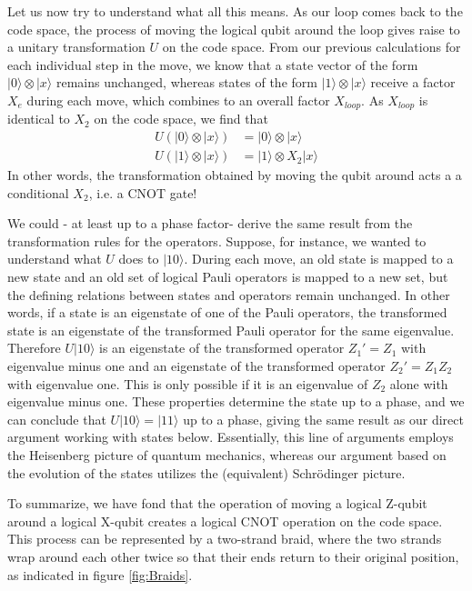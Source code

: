 \documentclass[a4paper, draft]{article}
\theoremstyle{own}
\theoremstyle{remark}
\begin{document}
Let us now try to understand what all this means. As our loop comes back to the code space, the process of moving the logical qubit around the loop gives raise to a unitary transformation $U$ on the code space. From our previous calculations for each individual step in the move, we know that a state vector of the form $|0 \rangle \otimes |x \rangle$ remains unchanged, whereas states of the form $|1 \rangle \otimes |x \rangle$ receive a factor $X_e$ during each move, which combines to an overall factor $X_{loop}$. As $X_{loop}$ is identical to $X_2$ on the code space, we find that
\begin{align*}
U(|0 \rangle \otimes |x \rangle) &= |0 \rangle \otimes |x \rangle \\
U(|1 \rangle \otimes |x \rangle) &= |1 \rangle \otimes X_2 |x \rangle 
\end{align*}
In other words, the transformation obtained by moving the qubit around acts a a conditional $X_2$, i.e. a CNOT gate!

We could - at least up to a phase factor- derive the same result from the transformation rules for the operators. Suppose, for instance, we wanted to understand what $U$ does to $|10\rangle$. During each move, an old state is mapped to a new state and an old set of logical Pauli operators is mapped to a new set, but the defining relations between states and operators remain unchanged. In other words, if a state is an eigenstate of one of the Pauli operators, the transformed state is an eigenstate of the transformed Pauli operator for the same eigenvalue. Therefore $U|10 \rangle$ is an eigenstate of the transformed operator $Z_1' = Z_1$ with eigenvalue minus one and an eigenstate of the transformed operator $Z_2' = Z_1 Z_2$ with eigenvalue one. This is only possible if it is an eigenvalue of $Z_2$ alone with eigenvalue minus one. These properties determine the state up to a phase, and we can conclude that $U|10 \rangle = |11 \rangle$ up to a phase, giving the same result as our direct argument working with states below. Essentially, this line of arguments employs the Heisenberg picture of quantum mechanics, whereas our argument based on the evolution of the states utilizes the (equivalent) Schr\"odinger picture.


To summarize, we have fond that the operation of moving a logical Z-qubit around a logical X-qubit creates a logical CNOT operation on the code space. This process can be represented by a two-strand braid, where the two strands wrap around each other twice so that their ends return to their original position, as indicated in figure \ref{fig:Braids}.
\end{document}
